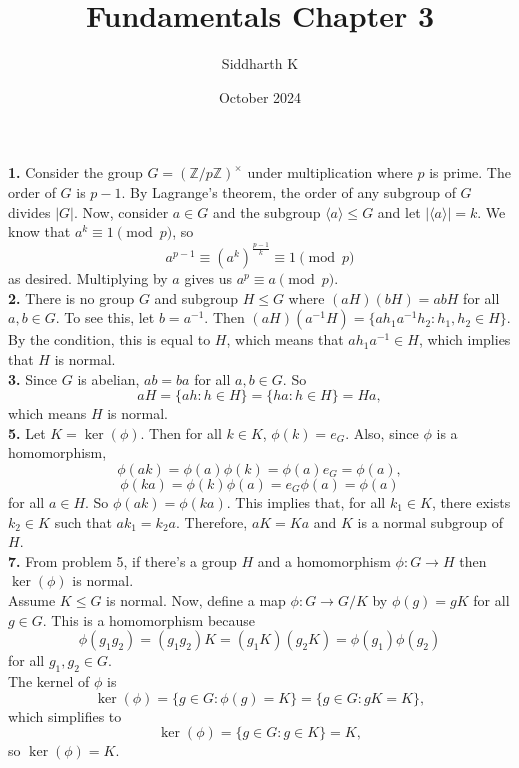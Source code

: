 \documentclass{article}
\title{Fundamentals Chapter 3}
\author{Siddharth K}
\date{October 2024}
\newcommand{\Z}{\mathbb{Z}}
\begin{document}
\maketitle

\textbf{1.} Consider the group $G = (\Z/p\Z)^\times$ under multiplication where $p$ is prime. The order of $G$ is $p - 1$. By Lagrange's theorem, the order of any subgroup of $G$ divides $|G|$. Now, consider $a \in G$ and the subgroup $\langle a \rangle \le G$ and let $|\langle a\rangle| = k$. We know that $a^k \equiv 1 \pmod{p}$, so
$$a^{p - 1} \equiv (a^k)^{\frac{p - 1}{k}} \equiv 1 \pmod{p}$$
as desired. Multiplying by $a$ gives us $a^p \equiv a \pmod{p}$. \\

\textbf{2.} There is no group $G$ and subgroup $H \le G$ where $(aH)(bH) = abH$ for all $a, b \in G$. To see this, let $b = a^{-1}$. Then $(aH)(a^{-1}H) = \{ah_1a^{-1}h_2: h_1, h_2 \in H\}$. By the condition, this is equal to $H$, which means that $ah_1a^{-1} \in H$, which implies that $H$ is normal. \\

\textbf{3.} Since $G$ is abelian, $ab = ba$ for all $a, b \in G$. So
$$aH = \{ah: h \in H\} = \{ha: h \in H\} = Ha,$$
which means $H$ is normal. \\

\textbf{5.} Let $K = \ker(\phi)$. Then for all $k \in K$, $\phi(k) = e_G$. Also, since $\phi$ is a homomorphism,
$$\phi(ak) = \phi(a)\phi(k) = \phi(a)e_G = \phi(a),$$
$$\phi(ka) = \phi(k)\phi(a) = e_G\phi(a) = \phi(a)$$
for all $a \in H$. So $\phi(ak) = \phi(ka)$. This implies that, for all $k_1 \in K$, there exists $k_2 \in K$ such that $ak_1 = k_2a$. Therefore, $aK = Ka$ and $K$ is a normal subgroup of $H$. \\

\textbf{7.} From problem 5, if there's a group $H$ and a homomorphism $\phi: G\to H$ then $\ker(\phi)$ is normal. \\

Assume $K \le G$ is normal. Now, define a map $\phi : G \to G/K$ by $\phi(g) = gK$ for all $g \in G$. This is a homomorphism because
$$\phi(g_1g_2) = (g_1g_2)K = (g_1K)(g_2K) = \phi(g_1)\phi(g_2)$$
for all $g_1, g_2 \in G$. \\

The kernel of $\phi$ is
$$\ker(\phi) = \{g \in G: \phi(g) = K\} = \{g \in G: gK = K\},$$
which simplifies to
$$\ker(\phi) = \{g \in G: g \in K\} = K,$$
so $\ker(\phi) = K$. \\
\end{document}
